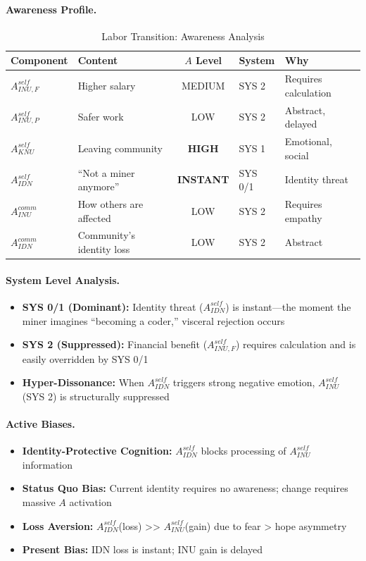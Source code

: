 \paragraph{Awareness Profile.}

\begin{table}[htbp]
\centering
\caption{Labor Transition: Awareness Analysis}
\label{tab:labor-awareness}
\renewcommand{\arraystretch}{1.3}
\begin{tabular}{@{}llcll@{}}
\toprule
\textbf{Component} & \textbf{Content} & \textbf{$A$ Level} & \textbf{System} & \textbf{Why} \\
\midrule
$A^{self}_{INU,F}$ & Higher salary & MEDIUM & SYS 2 & Requires calculation \\
$A^{self}_{INU,P}$ & Safer work & LOW & SYS 2 & Abstract, delayed \\
$A^{self}_{KNU}$ & Leaving community & \textbf{HIGH} & SYS 1 & Emotional, social \\
$A^{self}_{IDN}$ & ``Not a miner anymore'' & \textbf{INSTANT} & SYS 0/1 & Identity threat \\
$A^{comm}_{INU}$ & How others are affected & LOW & SYS 2 & Requires empathy \\
$A^{comm}_{IDN}$ & Community's identity loss & LOW & SYS 2 & Abstract \\
\bottomrule
\end{tabular}
\end{table}

\paragraph{System Level Analysis.}
\begin{itemize}
\item \textbf{SYS 0/1 (Dominant):} Identity threat ($A^{self}_{IDN}$) is instant---the 
moment the miner imagines ``becoming a coder,'' visceral rejection occurs
\item \textbf{SYS 2 (Suppressed):} Financial benefit ($A^{self}_{INU,F}$) requires 
calculation and is easily overridden by SYS 0/1
\item \textbf{Hyper-Dissonance:} When $A^{self}_{IDN}$ triggers strong negative emotion,
$A^{self}_{INU}$ (SYS 2) is structurally suppressed
\end{itemize}

\paragraph{Active Biases.}
\begin{itemize}
\item \textbf{Identity-Protective Cognition:} $A^{self}_{IDN}$ blocks processing of 
$A^{self}_{INU}$ information
\item \textbf{Status Quo Bias:} Current identity requires no awareness; change requires 
massive $A$ activation
\item \textbf{Loss Aversion:} $A^{self}_{IDN}$(loss) >> $A^{self}_{INU}$(gain) due to 
fear > hope asymmetry
\item \textbf{Present Bias:} IDN loss is instant; INU gain is delayed
\end{itemize}

